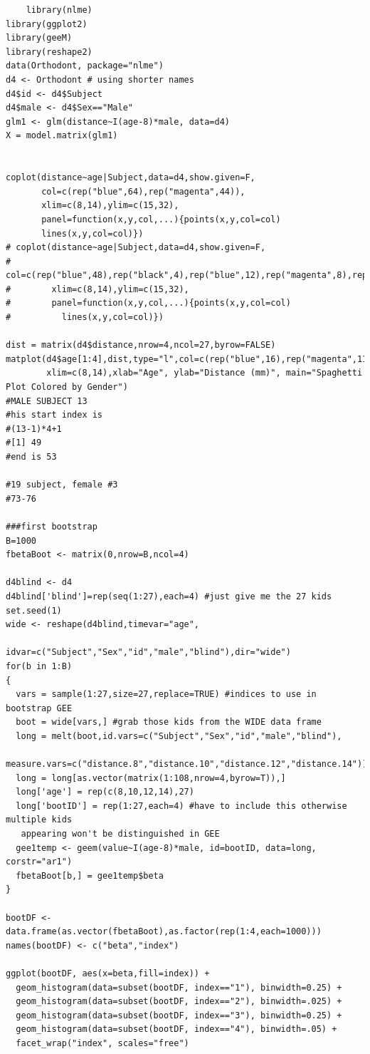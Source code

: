 \documentclass[11pt]{article}
\begin{document}
\begin{verbatim}
	library(nlme)
library(ggplot2)
library(geeM)
library(reshape2)
data(Orthodont, package="nlme")
d4 <- Orthodont # using shorter names
d4$id <- d4$Subject
d4$male <- d4$Sex=="Male"
glm1 <- glm(distance~I(age-8)*male, data=d4)
X = model.matrix(glm1)


coplot(distance~age|Subject,data=d4,show.given=F,
       col=c(rep("blue",64),rep("magenta",44)),
       xlim=c(8,14),ylim=c(15,32),
       panel=function(x,y,col,...){points(x,y,col=col)
       lines(x,y,col=col)})
# coplot(distance~age|Subject,data=d4,show.given=F,
#        col=c(rep("blue",48),rep("black",4),rep("blue",12),rep("magenta",8),rep("green",4),rep("magenta",32)),
#        xlim=c(8,14),ylim=c(15,32),
#        panel=function(x,y,col,...){points(x,y,col=col)
#          lines(x,y,col=col)})

dist = matrix(d4$distance,nrow=4,ncol=27,byrow=FALSE)
matplot(d4$age[1:4],dist,type="l",col=c(rep("blue",16),rep("magenta",11)),lty=1,
        xlim=c(8,14),xlab="Age", ylab="Distance (mm)", main="Spaghetti Plot Colored by Gender")
#MALE SUBJECT 13
#his start index is
#(13-1)*4+1
#[1] 49
#end is 53

#19 subject, female #3
#73-76

###first bootstrap
B=1000
fbetaBoot <- matrix(0,nrow=B,ncol=4)

d4blind <- d4
d4blind['blind']=rep(seq(1:27),each=4) #just give me the 27 kids
set.seed(1)
wide <- reshape(d4blind,timevar="age",
                idvar=c("Subject","Sex","id","male","blind"),dir="wide")
for(b in 1:B)
{
  vars = sample(1:27,size=27,replace=TRUE) #indices to use in bootstrap GEE
  boot = wide[vars,] #grab those kids from the WIDE data frame
  long = melt(boot,id.vars=c("Subject","Sex","id","male","blind"),
              measure.vars=c("distance.8","distance.10","distance.12","distance.14"))  
  long = long[as.vector(matrix(1:108,nrow=4,byrow=T)),]
  long['age'] = rep(c(8,10,12,14),27)
  long['bootID'] = rep(1:27,each=4) #have to include this otherwise multiple kids
   appearing won't be distinguished in GEE
  gee1temp <- geem(value~I(age-8)*male, id=bootID, data=long, corstr="ar1")
  fbetaBoot[b,] = gee1temp$beta
}

bootDF <- data.frame(as.vector(fbetaBoot),as.factor(rep(1:4,each=1000)))
names(bootDF) <- c("beta","index")

ggplot(bootDF, aes(x=beta,fill=index)) +
  geom_histogram(data=subset(bootDF, index=="1"), binwidth=0.25) +
  geom_histogram(data=subset(bootDF, index=="2"), binwidth=.025) +
  geom_histogram(data=subset(bootDF, index=="3"), binwidth=0.25) +
  geom_histogram(data=subset(bootDF, index=="4"), binwidth=.05) +
  facet_wrap("index", scales="free")



\end{verbatim}
\end{document}
